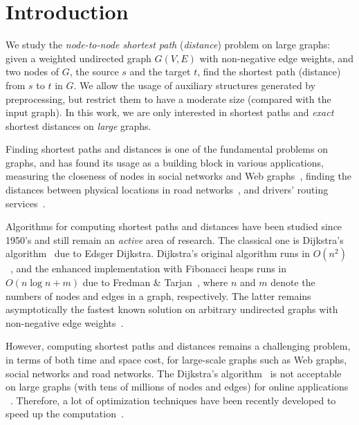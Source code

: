 \section{Introduction}
\label{sec-intro}


We study the {\em node-to-node shortest path} ({\em distance}) problem on large graphs: given a weighted undirected graph $G(V, E)$ with non-negative edge weights, and two nodes of $G$, the source $s$ and the target $t$, find the shortest path (distance) from $s$ to $t$ in $G$. We allow the usage of auxiliary structures  generated by preprocessing, but restrict them to have a moderate size (compared with the input graph).  In this work, we are only interested in shortest paths and {\em exact}  shortest distances on {\em large} graphs.

Finding shortest  paths and distances is one of the fundamental problems on graphs, and has found its usage as a building block in various applications, \eg measuring the closeness of nodes in social networks and Web graphs~\cite{LappasLT09,PotamiasBCG09,SarmaGNP10}, finding the distances between physical locations in road networks~\cite{WuXDCZZ12}, and drivers' routing services~\cite{DLiuYK13}.

Algorithms for computing shortest  paths and distances have been studied since 1950's and still remain an {\em active} area of research. The classical one is Dijkstra's algorithm~\cite{CormenLRS01} due to Edsger Dijkstra. Dijkstra's original algorithm runs in $O(n^2)$~\cite{Dijkstra59}, and the enhanced implementation with Fibonacci heaps runs in $O(n\log n + m)$ due to Fredman \& Tarjan~\cite{FredmanT84}, where $n$ and $m$ denote the numbers of nodes and edges in a graph, respectively. The latter remains asymptotically the fastest known solution on arbitrary undirected graphs with non-negative edge weights~\cite{ThorupZ05}.

However, computing shortest  paths and distances remains a challenging problem, in terms of both time and space cost, for large-scale graphs such as Web graphs, social networks and road networks. The Dijkstra's algorithm~\cite{FredmanT84} is not acceptable on large graphs (\eg with tens of millions of nodes and edges) for online applications ~\cite{PotamiasBCG09}. Therefore, a lot of optimization techniques have been recently developed to speed up the computation~\cite{PotamiasBCG09,SarmaGNP10,WuXDCZZ12,LubyR89,GeisbergerSSD08,Wei10,SankaranarayananSA09,SandersS05,ChengKCC12}.


